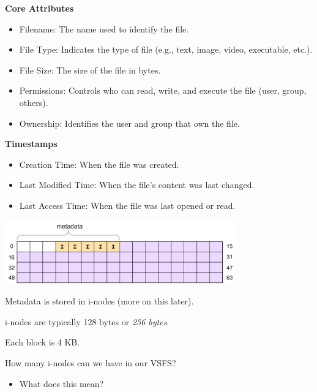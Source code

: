 \begin{slide}

    \bigskip

    \textbf{Core Attributes}
    \begin{itemize}
        \item Filename: The name used to identify the file.
        \item File Type: Indicates the type of file (e.g., text, image, video, executable, etc.).
        \item File Size: The size of the file in bytes.
        \item Permissions: Controls who can read, write, and execute the file (user, group, others).
        \item Ownership: Identifies the user and group that own the file.
    \end{itemize}
    \bigskip

    \textbf{Timestamps}
    \begin{itemize}
        \item Creation Time: When the file was created.
        \item Last Modified Time: When the file's content was last changed.
        \item Last Access Time: When the file was last opened or read.
    \end{itemize}

\end{slide}

\begin{slide}

    
    \includegraphics[width=100mm]{VSFS-2.png}
    \bigskip

    Metadata is stored in i-nodes (more on this later).
    \bigskip

    i-nodes are typically 128 bytes or \textit{256 bytes}.

    Each block is 4 KB.
    \bigskip

    How many i-nodes can we have in our VSFS?
    \begin{itemize}
        \item What does this mean?
    \end{itemize}

\end{slide}

